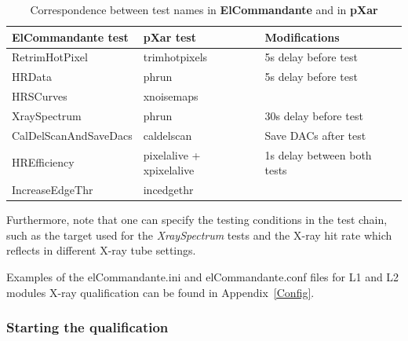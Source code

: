 \documentclass[a4paper,12pt,twoside]{article}
\begin{document}
\begin{itemize}
\begin{table}[]
\centering
\caption{Correspondence between test names in \textbf{ElCommandante} and in \textbf{pXar}}
\label{tests}
\begin{tabular}{@{}lll@{}}
\toprule
\textbf{ElCommandante} test    & \textbf{pXar} test                & Modifications               \\ \midrule
RetrimHotPixel        & trimhotpixels            & 5s delay before test        \\
HRData                & phrun                    & 5s delay before test        \\
HRSCurves             & xnoisemaps\footnotemark             &                             \\
XraySpectrum          & phrun                    & 30s delay before test       \\
CalDelScanAndSaveDacs & caldelscan\footnotemark[\value{footnote}]               & Save DACs after test        \\
HREfficiency          & pixelalive + xpixelalive\footnotemark[\value{footnote}] & 1s delay between both tests \\
IncreaseEdgeThr       & incedgethr               &                             \\ \bottomrule
\end{tabular}
\end{table}



Furthermore, note that one can specify the testing conditions in the test chain, such as the target used for the \textit{XraySpectrum} tests and the X-ray hit rate which reflects in different X-ray tube settings.

Examples of the elCommandante.ini and elCommandante.conf files for L1 and L2 modules X-ray qualification can be found in Appendix~\ref{Config}.

\end{itemize}
\subsubsection{Starting the qualification}
\end{document}
